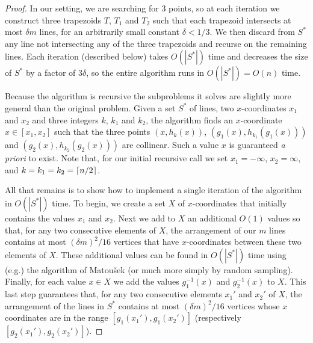 \documentclass[lotsofwhite]{patmorin}
\begin{document}
\begin{proof}
In our setting, we are searching for 3 points, so at each iteration we
construct three trapezoids $T$, $T_1$ and $T_2$ such that each
trapezoid intersects at most $\delta m$ lines, for an arbitrarily
small constant $\delta < 1/3$.  We then discard from $S^*$ any line
not intersecting any of the three trapezoids and recurse on the
remaining lines.  Each iteration (described below) takes $O(|S^*|)$
time and decreases the size of $S^*$ by a factor of $3\delta$, so the
entire algorithm runs in $O(|S^*|)=O(n)$ time.

Because the algorithm is recursive the subproblems it solves are
slightly more general than the original problem.  Given a set $S^*$ of
lines, two $x$-coordinates $x_1$ and $x_2$ and three integers $k$,
$k_1$ and $k_2$, the algorithm finds an $x$-coordinate $x\in[x_1,x_2]$
such that the three points $(x,h_k(x))$, $(g_1(x),h_{k_1}(g_1(x)))$
and $(g_2(x),h_{k_2}(g_2(x)))$ are collinear.  Such a value $x$ is
guaranteed \emph{a priori} to exist.  Note that, for our initial
recursive call we set $x_1=-\infty$, $x_2=\infty$, and
$k=k_1=k_2=\left\lceil n/2 \right\rceil$.

All that remains is to show how to implement a single iteration of the
algorithm in $O(|S^*|)$ time.  To begin, we create a set $X$ of
$x$-coordinates that initially contains the values $x_1$ and $x_2$.
Next we add to $X$ an additional $O(1)$ values so that, for any two
consecutive elements of $X$, the arrangement of our $m$ lines contains
at most $(\delta m)^2/16$ vertices that have $x$-coordinates between
these two elements of $X$.  These additional values can be found in
$O(|S^*|)$ time using (e.g.) the algorithm of Matou\v{s}ek \cite{m91}
(or much more simply by random sampling).  Finally, for each value
$x\in X$ we add the values $g_1^{-1}(x)$ and $g_2^{-1}(x)$ to $X$.
This last step guarantees that, for any two consecutive elements
$x_1'$ and $x_2'$ of $X$, the arrangement of the lines in $S^*$
contains at most $(\delta m)^2/16$ vertices whose $x$ coordinates are
in the range $[g_1(x_1'),g_1(x_2')]$ (respectively
$[g_2(x_1'),g_2(x_2')]$). 


\end{proof}
\end{document}
